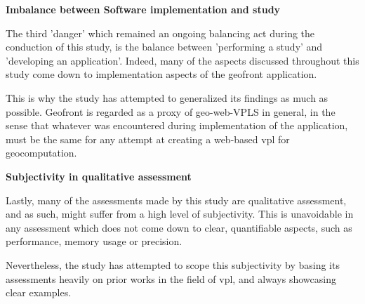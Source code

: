 \textbf{Imbalance between Software implementation and study}

The third 'danger' which remained an ongoing balancing act during the conduction of this study, is the balance between 'performing a study' and 'developing an application'. 
Indeed, many of the aspects discussed throughout this study come down to implementation aspects of the geofront application. 

This is why the study has attempted to generalized its findings as much as possible.
Geofront is regarded as a proxy of geo-web-VPLS in general, in the sense that whatever was encountered during implementation of the application, must be the same for any attempt at creating a web-based vpl for geocomputation.

\textbf{Subjectivity in qualitative assessment}

Lastly, many of the assessments made by this study are qualitative assessment, and as such, might suffer from a high level of subjectivity. 
This is unavoidable in any assessment which does not come down to clear, quantifiable aspects, such as performance, memory usage or precision. 

Nevertheless, the study has attempted to scope this subjectivity by basing its assessments heavily on prior works in the field of vpl, and always showcasing clear examples. 








  
